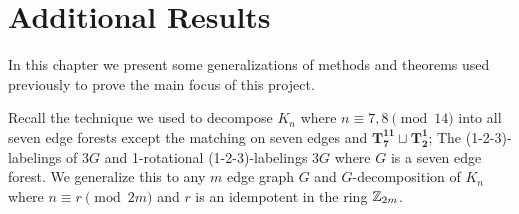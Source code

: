 \chapter{Additional Results}
In this chapter we present some generalizations of methods and theorems used previously to prove the main focus of this project.

Recall the technique we used to decompose $K_{n}$ where $n\equiv 7,8 \pmod{14}$ into all seven edge forests except the matching on seven edges and $\mathbf{T_{7}^{11}\sqcup T_{2}^{1}}$; The (1-2-3)-labelings of $3G$ and 1-rotational (1-2-3)-labelings $3G$ where $G$ is a seven edge forest. We generalize this to any $m$ edge graph $G$ and $G$-decomposition of $K_{n}$ where $n\equiv r\pmod{2m}$ and $r$ is an idempotent in the ring $\mathbb{Z}_{2m}$.





